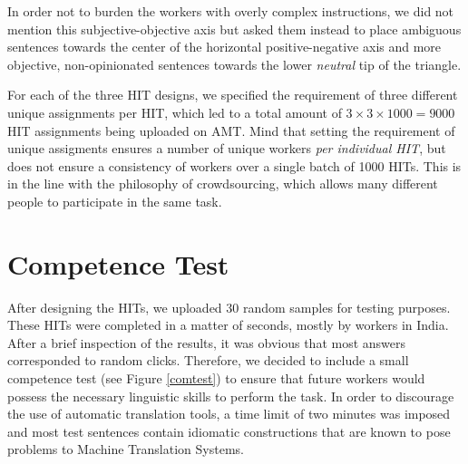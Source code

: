 \documentclass[11pt, a4paper,onecolumn]{article}
\begin{document}
In order not to burden the workers with overly complex instructions, we did not mention this subjective-objective axis but asked them instead to place ambiguous sentences towards the center of the horizontal positive-negative axis and more objective, non-opinionated sentences towards the lower \textit{neutral} tip of the triangle.

For each of the three HIT designs, we specified the requirement of three different unique assignments per HIT, which led to a total amount of $3 \times 3 \times 1000 = 9000$ HIT assignments being uploaded on AMT. Mind that setting the requirement of unique assigments ensures a number of unique workers \textit{per individual HIT}, but does not ensure a consistency of workers over a single batch of 1000 HITs. This is in the line with the philosophy of crowdsourcing, which allows many different people to participate in the same task.


\section{Competence Test}
\label{sect:comtest}

After designing the HITs, we uploaded 30 random samples for testing purposes. These HITs were completed in a matter of seconds, mostly by workers in India. After a brief inspection of the results, it was obvious that most answers corresponded to random clicks. Therefore, we decided to include a small competence test (see Figure \ref{comtest}) to ensure that future workers would possess the necessary linguistic skills to perform the task. In order to discourage the use of automatic translation tools, a time limit of two minutes was  imposed and most test sentences contain idiomatic constructions that are known to pose problems to Machine Translation Systems.
\end{document}
